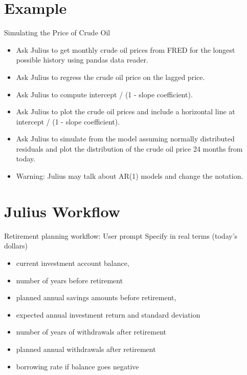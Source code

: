 \documentclass[10pt]{beamer}
\begin{document}
\section{Example}

\begin{frame}{Simulating the Price of Crude Oil}
\begin{itemize}
\item Ask Julius to get monthly crude oil prices from FRED for the longest possible history using pandas data reader.
\item Ask Julius to regress the crude oil price on the lagged price.
\item Ask Julius to compute intercept / (1 - slope coefficient).
\item Ask Julius to plot the crude oil prices and include a horizontal line at intercept / (1 - slope coefficient).
\item Ask Julius to simulate from the model assuming normally distributed residuals and plot the distribution of the crude oil price 24 months from today.
\item Warning: Julius may talk about AR(1) models and change the notation.
\end{itemize}
\end{frame}

\section{Julius Workflow}

\begin{frame}{Retirement planning workflow: User prompt}
Specify in real terms (today's dollars)
\begin{itemize}
\item  current investment account balance, 
\item number of years before retirement
\item planned annual savings amounts before retirement, 
\item expected annual investment return and standard deviation 
\item number of years of withdrawals after retirement
\item planned annual withdrawals after retirement
\item borrowing rate if balance goes negative
\end{itemize}
\end{frame}
\end{document}

